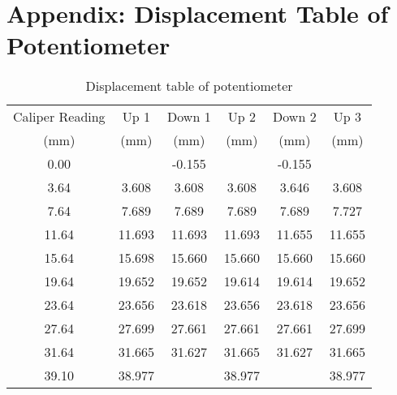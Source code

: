 \section{Appendix: Displacement Table of Potentiometer}
\label{sec:appendix-potentiometer-displacement-table}


\begin{table}[h]
    \centering
    \caption{Displacement table of potentiometer}
    \label{tab:appendix-potentiometer-displacement-table}
    \begin{tabular}{cccccc}
        \hline
        Caliper Reading & Up 1 & Down 1 & Up 2 & Down 2 & Up 3 \\
        (mm) & (mm) & (mm) & (mm) & (mm) & (mm) \\
        \midrule
        0.00 & & -0.155 & & -0.155 & \\
        3.64 & 3.608 & 3.608 & 3.608 & 3.646 & 3.608 \\
        7.64 & 7.689 & 7.689 & 7.689 & 7.689 & 7.727 \\
        11.64 & 11.693 & 11.693 & 11.693 & 11.655 & 11.655 \\
        15.64 & 15.698 & 15.660 & 15.660 & 15.660 & 15.660 \\
        19.64 & 19.652 & 19.652 & 19.614 & 19.614 & 19.652 \\
        23.64 & 23.656 & 23.618 & 23.656 & 23.618 & 23.656 \\
        27.64 & 27.699 & 27.661 & 27.661 & 27.661 & 27.699 \\
        31.64 & 31.665 & 31.627 & 31.665 & 31.627 & 31.665 \\
        39.10 & 38.977 & & 38.977 & & 38.977 \\
        \hline
    \end{tabular}
\end{table}
